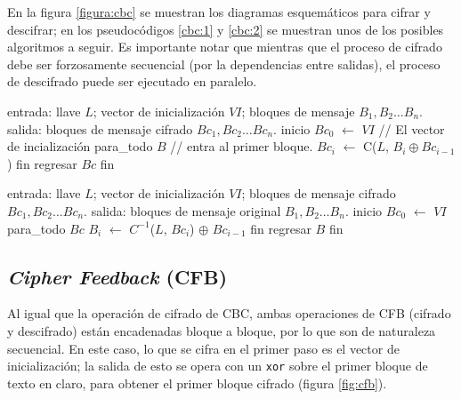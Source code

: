 En la figura \ref{figura:cbc} se muestran los diagramas esquemáticos para
cifrar y descifrar; en los pseudocódigos \ref{cbc:1} y \ref{cbc:2} se muestran
unos de los posibles algoritmos a seguir. Es importante notar que mientras que
el proceso de cifrado debe ser forzosamente secuencial (por la dependencias
entre salidas), el proceso de descifrado puede ser ejecutado en paralelo.

\vspace{0.5cm}


\begin{pseudocodigo}[caption={Modo de operación CBC, cifrado.}, label={cbc:1}]
  entrada: llave $ L $; vector de inicialización $ VI $;
           bloques de mensaje $ B_1, B_2 \dots B_n $.
   salida: bloques de mensaje cifrado $ Bc_1, Bc_2 \dots Bc_n $.
  inicio
    $Bc_0$ $\gets$ $ VI $                         // El vector de incialización
    para_todo $B$                 // entra al primer bloque.
      $Bc_i$ $\gets$ C($L$, $B_i \oplus Bc_{i - 1}$)
    fin
    regresar $Bc$
  fin
\end{pseudocodigo}

\begin{pseudocodigo}[caption={Modo de operación CBC, descifrado.}, label={cbc:2}]
  entrada: llave $ L $; vector de inicialización $ VI $;
           bloques de mensaje cifrado $ Bc_1, Bc_2 \dots Bc_n $.
   salida: bloques de mensaje original $ B_1, B_2 \dots B_n $.
  inicio
    $Bc_0$ $\gets$ $ VI $
    para_todo $Bc$
      $B_i$ $\gets$ $C^{-1}$($L$, $Bc_i$) $\oplus$ $Bc_{i-1}$
    fin
    regresar $B$
  fin
\end{pseudocodigo}

\subsection{\textit{Cipher Feedback} (CFB)}

Al igual que la operación de cifrado de CBC, ambas operaciones de CFB (cifrado
y descifrado) están encadenadas bloque a bloque, por lo que son de naturaleza
secuencial. En este caso, lo que se cifra en el primer paso es el vector de
inicialización; la salida de esto se opera con un \verb|xor| sobre el primer
bloque de texto en claro, para obtener el primer bloque cifrado (figura
\ref{fig:cfb}).


